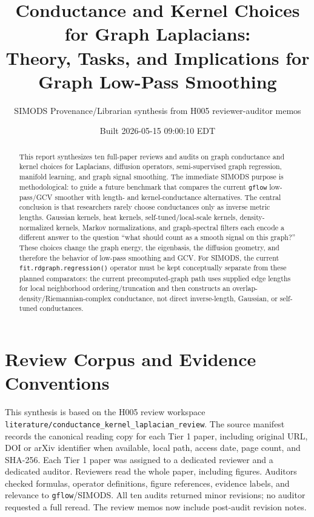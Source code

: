 \documentclass[11pt]{article}
\title{Conductance and Kernel Choices for Graph Laplacians:\\
Theory, Tasks, and Implications for Graph Low-Pass Smoothing}
\author{SIMODS Provenance/Librarian synthesis from H005 reviewer-auditor memos}
\date{Built 2026-05-15 09:00:10 EDT}
\newcommand{\code}[1]{\texttt{#1}}
\begin{document}
\maketitle

\begin{abstract}
This report synthesizes ten full-paper reviews and audits on graph conductance
and kernel choices for Laplacians, diffusion operators, semi-supervised graph
regression, manifold learning, and graph signal smoothing.  The immediate
SIMODS purpose is methodological: to guide a future benchmark that compares the
current \code{gflow} low-pass/GCV smoother with length- and kernel-conductance
alternatives.  The central conclusion is that researchers rarely choose
conductances only as inverse metric lengths.  Gaussian kernels, heat kernels,
self-tuned/local-scale kernels, density-normalized kernels, Markov
normalizations, and graph-spectral filters each encode a different answer to
the question ``what should count as a smooth signal on this graph?''  These
choices change the graph energy, the eigenbasis, the diffusion geometry, and
therefore the behavior of low-pass smoothing and GCV.  For SIMODS, the current
\code{fit.rdgraph.regression()} operator must be kept conceptually separate
from these planned comparators: the current precomputed-graph path uses supplied
edge lengths for local neighborhood ordering/truncation and then constructs an
overlap-density/Riemannian-complex conductance, not direct inverse-length,
Gaussian, or self-tuned conductances.
\end{abstract}

\tableofcontents
\newpage

\section{Review Corpus and Evidence Conventions}

This synthesis is based on the H005 review workspace
\code{literature/conductance\_kernel\_laplacian\_review}.  The source manifest
records the canonical reading copy for each Tier 1 paper, including original
URL, DOI or arXiv identifier when available, local path, access date, page
count, and SHA-256.  Each Tier 1 paper was assigned to a dedicated reviewer and
a dedicated auditor.  Reviewers read the whole paper, including figures.
Auditors checked formulas, operator definitions, figure references, evidence
labels, and relevance to \code{gflow}/SIMODS.  All ten audits returned minor
revisions; no auditor requested a full reread.  The review memos now include
post-audit revision notes.
\end{document}
